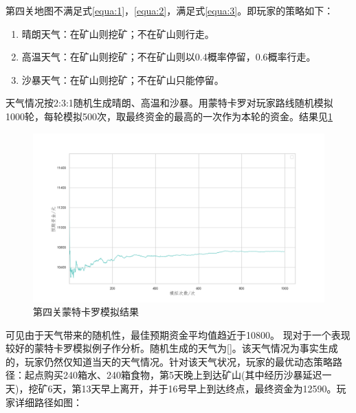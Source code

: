 \documentclass[withoutpre]{cumcmthesis} %
\begin{document}
第四关地图不满足式\cref{equa:1}，\cref{equa:2}，满足式\cref{equa:3}。即玩家的策略如下：
\begin{enumerate}
    \item 晴朗天气：在矿山则挖矿；不在矿山则行走。
    \item 高温天气：在矿山则挖矿；不在矿山则以0.4概率停留，0.6概率行走。
    \item 沙暴天气：在矿山则挖矿；不在矿山只能停留。
\end{enumerate}
天气情况按2:3:1随机生成晴朗、高温和沙暴。用蒙特卡罗对玩家路线随机模拟1000轮，每轮模拟500次，取最终资金的最高的一次作为本轮的资金。结果见\cref{fig:check4}
\begin{figure}[H]
    \centering
    \includegraphics[scale=0.5]{figures/check4.png}
    \caption{第四关蒙特卡罗模拟结果}
    \label{fig:check4}
\end{figure}
可见由于天气带来的随机性，最佳预期资金平均值趋近于10800。
现对于一个表现较好的蒙特卡罗模拟例子作分析。随机生成的天气为[]。该天气情况为事实生成的，玩家仍然仅知道当天的天气情况。针对该天气状况，玩家的最优动态策略路径：起点购买240箱水、240箱食物，第5天晚上到达矿山(其中经历沙暴延迟一天)，挖矿6天，第13天早上离开，并于16号早上到达终点，最终资金为12590。玩家详细路径如图：
\end{document}
